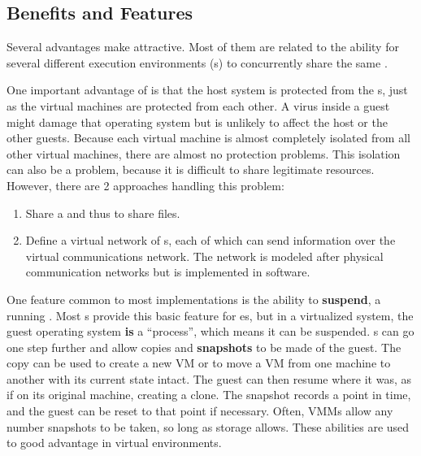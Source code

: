 \subsection{Benefits and Features}\label{subsubsec:VM_Benefits_Features}
Several advantages make  attractive.
Most of them are related to the ability for several different execution environments (s) to concurrently share the same .

One important advantage of  is that the host system is protected from the s, just as the virtual machines are protected from each other.
A virus inside a guest  might damage that operating system but is unlikely to affect the host or the other guests.
Because each virtual machine is almost completely isolated from all other virtual machines, there are almost no protection problems.
This isolation can also be a problem, because it is difficult to share legitimate resources.
However, there are 2 approaches handling this problem:
\begin{enumerate}[noitemsep]
\item Share a   and thus to share files.
\item Define a virtual network of s, each of which can send information over the virtual communications network.
  The network is modeled after physical communication networks but is implemented in software.
\end{enumerate}

One feature common to most  implementations is the ability to \textbf{suspend}, a running .
Most s provide this basic feature for es, but in a virtualized system, the guest operating system \textbf{is} a ``process'', which means it can be suspended.
s can go one step further and allow copies and \textbf{snapshots} to be made of the guest.
The copy can be used to create a new VM or to move a VM from one machine to another with its current state intact.
The guest can then resume where it was, as if on its original machine, creating a clone.
The snapshot records a point in time, and the guest can be reset to that point if necessary.
Often, VMMs allow any number snapshots to be taken, so long as storage allows.
These abilities are used to good advantage in virtual environments.

